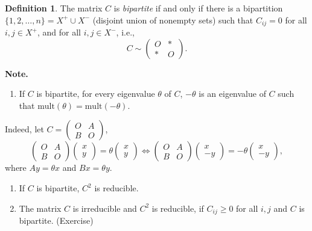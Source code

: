\documentclass[
]{book}
\providecommand{\tightlist}{%
  \setlength{\itemsep}{0pt}\setlength{\parskip}{0pt}}
\theoremstyle{definition}
\newtheorem{definition}{Definition}[chapter]
\theoremstyle{definition}
\theoremstyle{definition}
\theoremstyle{definition}
\theoremstyle{remark}
\begin{document}
\begin{definition}
\protect\hypertarget{def:bipartite-mat}{}\label{def:bipartite-mat}The matrix \(C\) is \emph{bipartite} if and only if there is a bipartition \(\{1, 2, \ldots, n\} = X^+ \cup X^-\) (disjoint union of nonempty sets) such that \(C_{ij} = 0\) for all \(i,j\in X^+\), and for all \(i,j\in X^-\), i.e.,
\[ C \sim \begin{pmatrix} O & \ast \\ \ast  & O \end{pmatrix}.\]
\end{definition}

\textbf{Note.}

\begin{enumerate}
\def\labelenumi{\arabic{enumi}.}
\tightlist
\item
  If \(C\) is bipartite, for every eigenvalue \(\theta\) of \(C\), \(-\theta\) is an eigenvalue of \(C\) such that \(\mathrm{mult}(\theta) = \mathrm{mult}(-\theta)\).
\end{enumerate}

Indeed, let \(C = \begin{pmatrix} O & A \\ B & O \end{pmatrix}\),
\[\begin{pmatrix} O & A \\ B & O \end{pmatrix} \begin{pmatrix}x\\y\end{pmatrix} = \theta \begin{pmatrix}x\\y\end{pmatrix}\Leftrightarrow \begin{pmatrix} O & A \\ B & O \end{pmatrix} \begin{pmatrix}x\\-y\end{pmatrix} = -\theta \begin{pmatrix}x\\-y\end{pmatrix}, \]
where \(Ay = \theta x\) and \(Bx = \theta y\).

\begin{enumerate}
\def\labelenumi{\arabic{enumi}.}
\setcounter{enumi}{1}
\item
  If \(C\) is bipartite, \(C^2\) is reducible.
\item
  The matrix \(C\) is irreducible and \(C^2\) is reducible, if \(C_{ij} \geq 0\) for all \(i,j\) and \(C\) is bipartite. (Exercise)
\end{enumerate}
\end{document}
